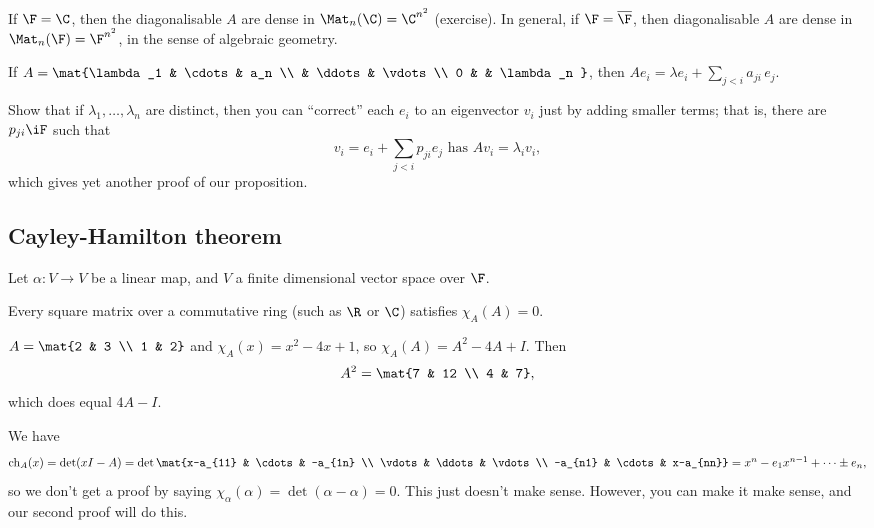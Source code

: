 \begin{remark}
	If $\F=\C$, then the diagonalisable $A$ are dense in $\Mat_n(\C)=\C^{n^2}$ (exercise). In general, if $\F=\overline{\F}$, then diagonalisable $A$ are dense in $\Mat_n(\F)=\F^{n^2}$, in the sense of algebraic geometry.
\end{remark}

\begin{exercise}
	If $A=\mat{\lambda_1  &   \cdots & a_n \\ & \ddots & \vdots \\ 0 & & \lambda_n }$, then $Ae_i=\lambda e_i+\sum_{j<i} a_{ji} \, e_j$.
	
	Show that if $\lambda_1,\ldots,\lambda_n$ are distinct, then you can ``correct'' each $e_i$ to an eigenvector $v_i$ just by adding smaller terms; that is, there are $p_{ji}\iF$ such that
	\begin{equation*}
		v_i = e_i + \sum_{j<i} p_{ji} e_j \text{ has } Av_i = \lambda_i v_i,
	\end{equation*}
	which gives yet another proof of our proposition.
\end{exercise}


	\pagebreak

\subsection{Cayley-Hamilton theorem}  %
\label{sub:cayley_hamilton_theorem}

Let $\alpha:V\to V$ be a linear map, and $V$ a finite dimensional vector space over $\F$.

\begin{theorem}
	 Every square matrix over a commutative ring (such as $\R$ or $\C$) satisfies $\chi_A(A)=0$.
\end{theorem}

\begin{example}
	$A=\mat{2 & 3 \\ 1 & 2}$ and $\chi_A(x)=x^2-4x+1$, so $\chi_A(A) = A^2-4A+I$. Then
	\begin{equation*}
		A^2 = \mat{7 & 12 \\ 4 & 7},
	\end{equation*}
	which does equal $4A-I$.
\end{example}

\begin{remark}
	We have
	\begin{equation*}
		\chi_A(x) = \det(xI-A) = \det \mat{x-a_{11} & \cdots & -a_{1n} \\ \vdots & \ddots & \vdots \\ -a_{n1} & \cdots & x-a_{nn}} = x^n - e_1 x^{n-1} + \cdots \pm e_n,
	\end{equation*}
	so we don't get a proof by saying $\chi_\alpha(\alpha)=\det(\alpha-\alpha)=0$. This just doesn't make sense. However, you can make it make sense, and our second proof will do this. 
\end{remark}

